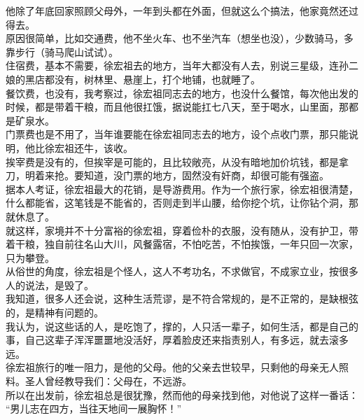 \begin{multicols}{\theparacolNo}
他除了年底回家照顾父母外，一年到头都在外面，但就这么个搞法，他家竟然还过得去。\\

原因很简单，比如交通费，他不坐火车、也不坐汽车（想坐也没），少数骑马，多靠步行（骑马爬山试试）。\\

住宿费，基本不需要，徐宏祖去的地方，当年大都没有人去，别说三星级，连孙二娘的黑店都没有，树林里、悬崖上，打个地铺，也就睡了。\\

餐饮费，也没有，我考察过，徐宏祖同志去的地方，也没什么餐馆，每次他出发的时候，都是带着干粮，而且他很扛饿，据说能扛七八天，至于喝水，山里面，那都是矿泉水。\\

门票费也是不用了，当年谁要能在徐宏祖同志去的地方，设个点收门票，那只能说明，他比徐宏祖还牛，该收。\\

挨宰费是没有的，但挨宰是可能的，且比较敞亮，从没有暗地加价坑钱，都是拿刀，明着来抢。要知道，没门票的地方，固然没有奸商，却很可能有强盗。\\

据本人考证，徐宏祖最大的花销，是导游费用。作为一个旅行家，徐宏祖很清楚，什么都能省，这笔钱是不能省的，否则走到半山腰，给你挖个坑，让你钻个洞，那就休息了。\\

就这样，家境并不十分富裕的徐宏祖，穿着俭朴的衣服，没有随从，没有护卫，带着干粮，独自前往名山大川，风餐露宿，不怕吃苦，不怕挨饿，一年只回一次家，只为攀登。\\

从俗世的角度，徐宏祖是个怪人，这人不考功名，不求做官，不成家立业，按很多人的说法，是毁了。\\

我知道，很多人还会说，这种生活荒谬，是不符合常规的，是不正常的，是缺根弦的，是精神有问题的。\\

我认为，说这些话的人，是吃饱了，撑的，人只活一辈子，如何生活，都是自己的事，自己这辈子浑浑噩噩地没活好，厚着脸皮还来指责别人，有多远，就去滚多远。\\

徐宏祖旅行的唯一阻力，是他的父母。他的父亲去世较早，只剩他的母亲无人照料。圣人曾经教导我们：父母在，不远游。\\

所以在出发前，徐宏祖总是很犹豫，然而他的母亲找到他，对他说了这样一番话：\\

“男儿志在四方，当往天地间一展胸怀！”\\


\end{multicols}
